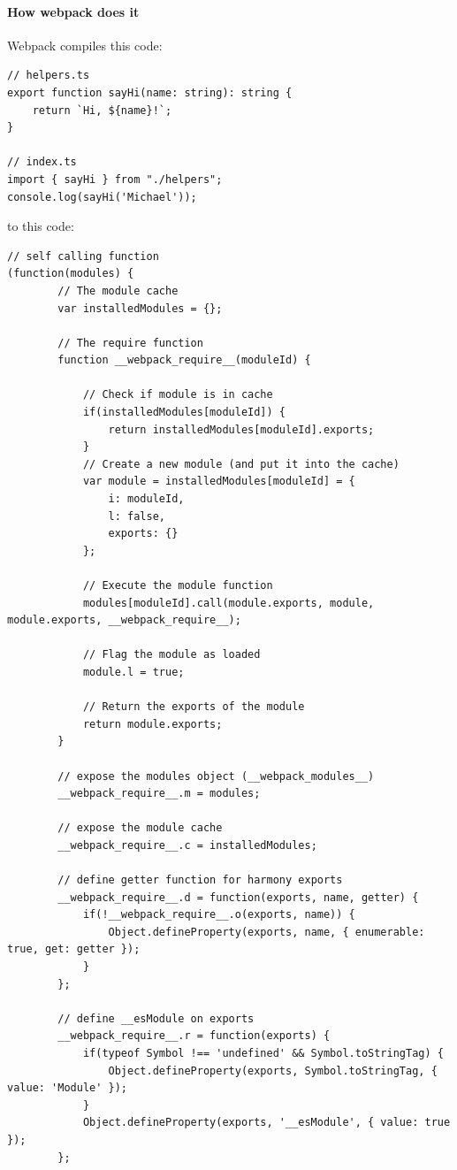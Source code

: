 \paragraph{How webpack does it}
Webpack compiles this code:
\begin{lstlisting}
// helpers.ts
export function sayHi(name: string): string {
    return `Hi, ${name}!`;
}

// index.ts
import { sayHi } from "./helpers";
console.log(sayHi('Michael'));
\end{lstlisting}

to this code: 
\begin{lstlisting}
// self calling function
(function(modules) {
        // The module cache
        var installedModules = {};
    
        // The require function
        function __webpack_require__(moduleId) {
    
            // Check if module is in cache
            if(installedModules[moduleId]) {
                return installedModules[moduleId].exports;
            }
            // Create a new module (and put it into the cache)
            var module = installedModules[moduleId] = {
                i: moduleId,
                l: false,
                exports: {}
            };
    
            // Execute the module function
            modules[moduleId].call(module.exports, module, module.exports, __webpack_require__);
    
            // Flag the module as loaded
            module.l = true;
    
            // Return the exports of the module
            return module.exports;
        }
    
        // expose the modules object (__webpack_modules__)
        __webpack_require__.m = modules;
    
        // expose the module cache
        __webpack_require__.c = installedModules;
    
        // define getter function for harmony exports
        __webpack_require__.d = function(exports, name, getter) {
            if(!__webpack_require__.o(exports, name)) {
                Object.defineProperty(exports, name, { enumerable: true, get: getter });
            }
        };
    
        // define __esModule on exports
        __webpack_require__.r = function(exports) {
            if(typeof Symbol !== 'undefined' && Symbol.toStringTag) {
                Object.defineProperty(exports, Symbol.toStringTag, { value: 'Module' });
            }
            Object.defineProperty(exports, '__esModule', { value: true });
        };
    

\end{lstlisting}
